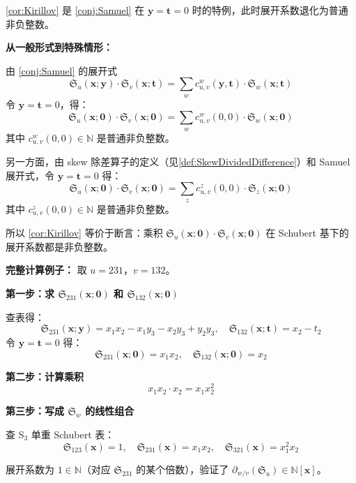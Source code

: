 \begin{Example}
\label{ex:KirillovConjectureExample}

\cref{cor:Kirillov} 是 \cref{conj:Samuel} 在 $\mathbf{y} = \mathbf{t} = 0$ 时的特例，此时展开系数退化为普通非负整数。

\textbf{从一般形式到特殊情形：}

由 \cref{conj:Samuel} 的展开式
$$\mathfrak{S}_u(\mathbf{x}; \mathbf{y}) \cdot \mathfrak{S}_v(\mathbf{x}; \mathbf{t}) = \sum_w c^w_{u,v}(\mathbf{y}, \mathbf{t}) \cdot \mathfrak{S}_w(\mathbf{x}; \mathbf{t})$$
令 $\mathbf{y} = \mathbf{t} = 0$，得：
$$\mathfrak{S}_u(\mathbf{x}; \mathbf{0}) \cdot \mathfrak{S}_v(\mathbf{x}; \mathbf{0}) = \sum_w c^w_{u,v}(0, 0) \cdot \mathfrak{S}_w(\mathbf{x}; \mathbf{0})$$
其中 $c^w_{u,v}(0, 0) \in \mathbb{N}$ 是普通非负整数。

另一方面，由 skew 除差算子的定义（见\cref{def:SkewDividedDifference}）和 Samuel 展开式，令 $\mathbf{y} = \mathbf{t} = 0$ 得：
$$\mathfrak{S}_u(\mathbf{x}; \mathbf{0}) \cdot \mathfrak{S}_v(\mathbf{x}; \mathbf{0}) = \sum_z c^z_{u,v}(0, 0) \cdot \mathfrak{S}_z(\mathbf{x}; \mathbf{0})$$
其中 $c^z_{u,v}(0, 0) \in \mathbb{N}$ 是普通非负整数。

所以 \cref{cor:Kirillov} 等价于断言：乘积 $\mathfrak{S}_u(\mathbf{x}; \mathbf{0}) \cdot \mathfrak{S}_v(\mathbf{x}; \mathbf{0})$ 在 Schubert 基下的展开系数都是非负整数。

\textbf{完整计算例子：} 取 $u = 231$，$v = 132$。

\textbf{第一步：求 $\mathfrak{S}_{231}(\mathbf{x}; \mathbf{0})$ 和 $\mathfrak{S}_{132}(\mathbf{x}; \mathbf{0})$}

查表得：
$$\mathfrak{S}_{231}(\mathbf{x}; \mathbf{y}) = x_1 x_2 - x_1 y_3 - x_2 y_3 + y_2 y_3, \quad \mathfrak{S}_{132}(\mathbf{x}; \mathbf{t}) = x_2 - t_2$$
令 $\mathbf{y} = \mathbf{t} = 0$ 得：
$$\mathfrak{S}_{231}(\mathbf{x}; \mathbf{0}) = x_1 x_2, \quad \mathfrak{S}_{132}(\mathbf{x}; \mathbf{0}) = x_2$$

\textbf{第二步：计算乘积}
$$x_1 x_2 \cdot x_2 = x_1 x_2^2$$

\textbf{第三步：写成 $\mathfrak{S}_w$ 的线性组合}

查 S$_3$ 单重 Schubert 表：
$$\mathfrak{S}_{123}(\mathbf{x}) = 1, \quad \mathfrak{S}_{231}(\mathbf{x}) = x_1 x_2, \quad \mathfrak{S}_{321}(\mathbf{x}) = x_1^2 x_2$$

展开系数为 $1 \in \mathbb{N}$（对应 $\mathfrak{S}_{231}$ 的某个倍数），验证了 $\partial_{w/v}(\mathfrak{S}_u) \in \mathbb{N}[\mathbf{x}]$。
\end{Example}

